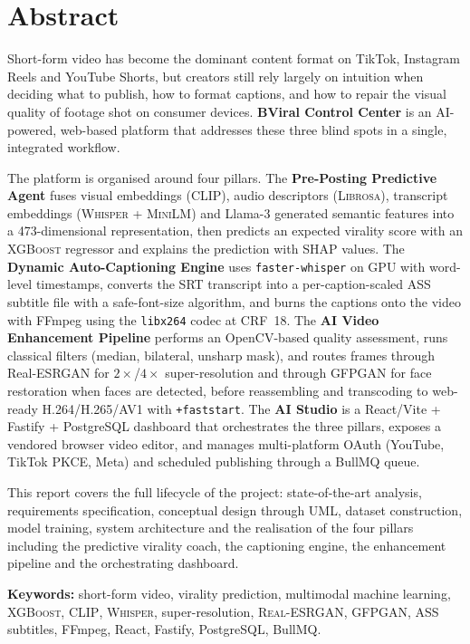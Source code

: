 \chapter*{Abstract}
\thispagestyle{plain}

\vspace{0.5cm}

Short-form video has become the dominant content format on TikTok, Instagram Reels and
YouTube Shorts, but creators still rely largely on intuition when deciding what to publish,
how to format captions, and how to repair the visual quality of footage shot on consumer
devices. \textbf{BViral Control Center} is an AI-powered, web-based platform that addresses these
three blind spots in a single, integrated workflow.

The platform is organised around four pillars. The \textbf{Pre-Posting Predictive Agent} fuses
visual embeddings (\textsc{CLIP}), audio descriptors (\textsc{Librosa}), transcript embeddings
(\textsc{Whisper} + \textsc{MiniLM}) and Llama-3 generated semantic features into a 473-dimensional
representation, then predicts an expected virality score with an \textsc{XGBoost} regressor and
explains the prediction with \textsc{SHAP} values. The \textbf{Dynamic Auto-Captioning Engine}
uses \texttt{faster-whisper} on GPU with word-level timestamps, converts the SRT transcript into a
per-caption-scaled \textsc{ASS} subtitle file with a safe-font-size algorithm, and burns the
captions onto the video with FFmpeg using the \texttt{libx264} codec at CRF~18. The
\textbf{AI Video Enhancement Pipeline} performs an OpenCV-based quality assessment, runs
classical filters (median, bilateral, unsharp mask), and routes frames through Real-ESRGAN for
$2\times$/$4\times$ super-resolution and through GFPGAN for face restoration when faces are
detected, before reassembling and transcoding to web-ready H.264/H.265/AV1 with
\texttt{+faststart}. The \textbf{AI Studio} is a React/Vite + Fastify + PostgreSQL dashboard that
orchestrates the three pillars, exposes a vendored browser video editor, and manages
multi-platform OAuth (YouTube, TikTok PKCE, Meta) and scheduled publishing through a BullMQ
queue.

This report covers the full lifecycle of the project: state-of-the-art analysis, requirements
specification, conceptual design through UML, dataset construction, model training, system
architecture and the realisation of the four pillars including the predictive virality coach,
the captioning engine, the enhancement pipeline and the orchestrating dashboard.

\vspace{0.6cm}

\noindent\textbf{Keywords:} short-form video, virality prediction, multimodal machine learning,
\textsc{XGBoost}, \textsc{CLIP}, \textsc{Whisper}, super-resolution, \textsc{Real-ESRGAN}, \textsc{GFPGAN},
ASS subtitles, FFmpeg, React, Fastify, PostgreSQL, BullMQ.

\cleardoublepage
